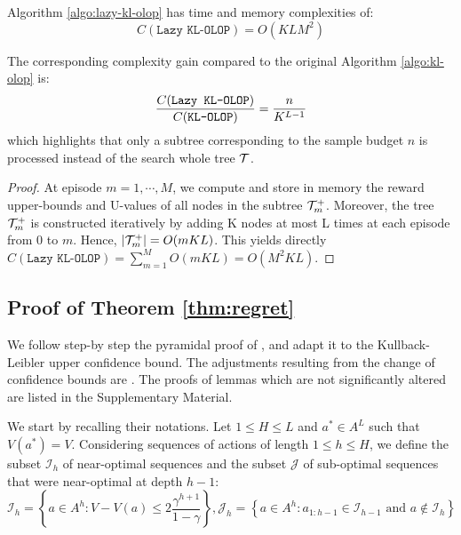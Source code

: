 \begin{proposition}
	Algorithm \ref{algo:lazy-kl-olop} has time and memory complexities of:
	\begin{equation*}
	C(\texttt{Lazy KL-OLOP}) = O(KLM^2)
	\end{equation*}
	
	The corresponding complexity gain compared to the original Algorithm \ref{algo:kl-olop} is: 
	\begin{equation*}
	\frac{C(\texttt{Lazy KL-OLOP})}{C(\texttt{KL-OLOP})} = \frac{n}{K^{L-1}}
	\end{equation*}
	which highlights that only a subtree corresponding to the sample budget $n$ is processed instead of the search whole tree $\mathcal{T}$.
\end{proposition}
\begin{proof}
	At episode $m = 1, \cdots, M$, we compute and store in memory the reward upper-bounds and U-values of all nodes in the subtree $\mathcal{T}_m^+$. Moreover, the tree $\mathcal{T}_m^+$ is constructed iteratively by adding K nodes at most L times at each episode from 0 to $m$. Hence, $|\mathcal{T}_m^+| = O(mKL)$.
	This yields directly $C(\texttt{Lazy KL-OLOP}) = \sum_{m=1}^M O(mKL) = O(M^2KL)$.
\end{proof}

\subsection{Proof of Theorem \ref{thm:regret}}
\label{sec:regret-proof}


We follow step-by step the pyramidal proof of \citep{Bubeck2010}, and adapt it to the Kullback-Leibler upper confidence bound. The adjustments resulting from the change of confidence bounds are . The proofs of lemmas which are not significantly altered are listed in the Supplementary Material. 

We start by recalling their notations.
Let $1 \leq H \leq L$ and $a^* \in A^L$ such that $V(a^*) = V$.
Considering sequences of actions of length $1 \leq h \leq H$, we define the subset $\mathcal{I}_h$ of near-optimal sequences and the subset $\mathcal{J}$ of sub-optimal sequences that were near-optimal at depth $h-1$:
\begin{equation*}
\mathcal{I}_h = \left\{a \in A^h: V - V(a) \leq 2\frac{\gamma^{h+1}}{1-\gamma}\right\}, \mathcal{J}_h = \left\{a \in A^h: a_{1:h-1} \in \mathcal{I}_{h-1} \text{ and } a \not\in \mathcal{I}_h\right\}
\end{equation*}

